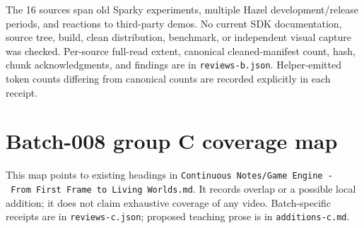 The 16 sources span old Sparky experiments, multiple Hazel development/release periods, and reactions to third-party demos. No current SDK documentation, source tree, build, clean distribution, benchmark, or independent visual capture was checked. Per-source full-read extent, canonical cleaned-manifest count, hash, chunk acknowledgments, and findings are in \texttt{reviews-b.json}. Helper-emitted token counts differing from canonical counts are recorded explicitly in each receipt.

\section{Batch-008 group C coverage map}\label{batch-008-group-c-coverage-map}

This map points to existing headings in \texttt{Continuous\ Notes/Game\ Engine\ -\ From\ First\ Frame\ to\ Living\ Worlds.md}. It records overlap or a possible local addition; it does not claim exhaustive coverage of any video. Batch-specific receipts are in \texttt{reviews-c.json}; proposed teaching prose is in \texttt{additions-c.md}.

